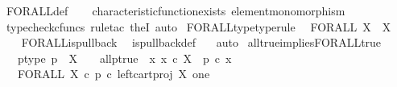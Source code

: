 \begin{isabellebody}
\ FORALL{\isacharunderscore}{\kern0pt}def\isanewline
\ \ \isamarkupfalse%
\ characteristic{\isacharunderscore}{\kern0pt}function{\isacharunderscore}{\kern0pt}exists\ element{\isacharunderscore}{\kern0pt}monomorphism\isanewline
\ \ \isamarkupfalse%
\ {\isacharparenleft}{\kern0pt}typecheck{\isacharunderscore}{\kern0pt}cfuncs{\isacharcomma}{\kern0pt}\ rule{\isacharunderscore}{\kern0pt}tac\ the{}I{}{\isacharcomma}{\kern0pt}\ auto{\isacharparenright}{\kern0pt}%
\endisatagproof
{\isafoldproof}%
%
\isadelimproof
\isanewline
%
\endisadelimproof
\isanewline
{}\isamarkupfalse%
\ FORALL{\isacharunderscore}{\kern0pt}type{\isacharbrackleft}{\kern0pt}type{\isacharunderscore}{\kern0pt}rule{\isacharbrackright}{\kern0pt}{\isacharcolon}{\kern0pt}\isanewline
\ \ {\isachardoublequoteopen}FORALL\ X\ {\isacharcolon}{\kern0pt}\ {\isasymOmega}\isactrlbsup X\isactrlesup \ {\isasymrightarrow}\ {\isasymOmega}{\isachardoublequoteclose}\isanewline
%
\isadelimproof
\ \ %
\endisadelimproof
%
\isatagproof
{}\isamarkupfalse%
\ FORALL{\isacharunderscore}{\kern0pt}is{\isacharunderscore}{\kern0pt}pullback\ \isamarkupfalse%
\ is{\isacharunderscore}{\kern0pt}pullback{\isacharunderscore}{\kern0pt}def\ \ \isamarkupfalse%
\ auto%
\endisatagproof
{\isafoldproof}%
%
\isadelimproof
\isanewline
%
\endisadelimproof
\isanewline
{}\isamarkupfalse%
\ all{\isacharunderscore}{\kern0pt}true{\isacharunderscore}{\kern0pt}implies{\isacharunderscore}{\kern0pt}FORALL{\isacharunderscore}{\kern0pt}true{\isacharcolon}{\kern0pt}\isanewline
\ \ \ p{\isacharunderscore}{\kern0pt}type{\isacharcolon}{\kern0pt}\ {\isachardoublequoteopen}p\ {\isacharcolon}{\kern0pt}\ X\ {\isasymrightarrow}\ {\isasymOmega}{\isachardoublequoteclose}\ \ all{\isacharunderscore}{\kern0pt}p{\isacharunderscore}{\kern0pt}true{\isacharcolon}{\kern0pt}\ {\isachardoublequoteopen}{\isasymAnd}\ x{\isachardot}{\kern0pt}\ x\ {\isasymin}\isactrlsub c\ X\ {\isasymLongrightarrow}\ p\ {\isasymcirc}\isactrlsub c\ x\ {\isacharequal}{\kern0pt}\ {\isasymt}{\isachardoublequoteclose}\isanewline
\ \ \ {\isachardoublequoteopen}FORALL\ X\ {\isasymcirc}\isactrlsub c\ {\isacharparenleft}{\kern0pt}p\ {\isasymcirc}\isactrlsub c\ left{\isacharunderscore}{\kern0pt}cart{\isacharunderscore}{\kern0pt}proj\ X\ one{\isacharparenright}{\kern0pt}\isactrlsup {\isasymsharp}\ {\isacharequal}{\kern0pt}\ {\isasymt}{\isachardoublequoteclose}\isanewline
%
\isadelimproof
%
\endisadelimproof
%

\end{isabellebody}
